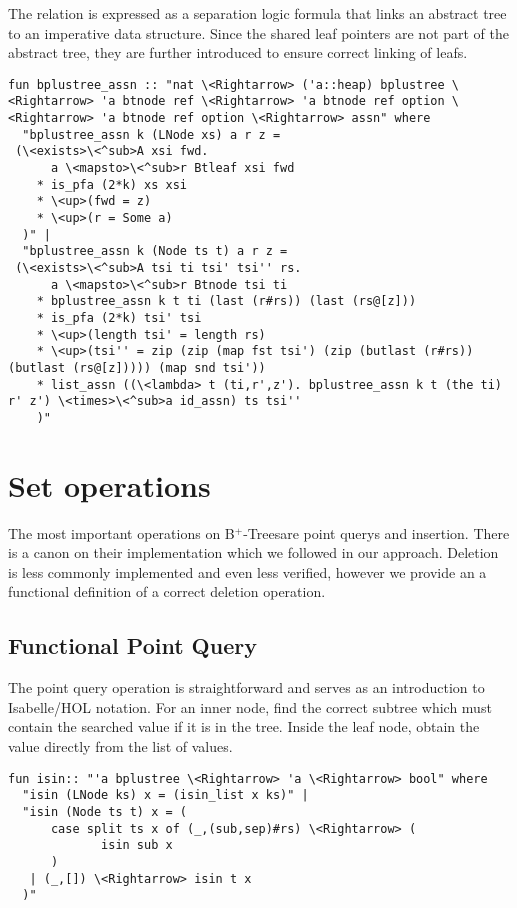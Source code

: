 \documentclass[a4paper,UKenglish,cleveref, autoref, thm-restate]{lipics-v2021}
\newcommand{\btrees}{B$^+$-Trees}
\begin{document}
The relation is expressed as a separation logic formula that links an abstract tree to an
imperative data structure.
Since the shared leaf pointers are not part of the abstract tree,
they are further introduced to ensure correct linking of leafs.

\begin{lstlisting}[mathescape=true, language=Isabelle,label=lst:btree-relation]
fun bplustree_assn :: "nat \<Rightarrow> ('a::heap) bplustree \<Rightarrow> 'a btnode ref \<Rightarrow> 'a btnode ref option \<Rightarrow> 'a btnode ref option \<Rightarrow> assn" where
  "bplustree_assn k (LNode xs) a r z =
 (\<exists>\<^sub>A xsi fwd.
      a \<mapsto>\<^sub>r Btleaf xsi fwd
    * is_pfa (2*k) xs xsi
    * \<up>(fwd = z)
    * \<up>(r = Some a)
  )" |
  "bplustree_assn k (Node ts t) a r z =
 (\<exists>\<^sub>A tsi ti tsi' tsi'' rs.
      a \<mapsto>\<^sub>r Btnode tsi ti
    * bplustree_assn k t ti (last (r#rs)) (last (rs@[z]))
    * is_pfa (2*k) tsi' tsi
    * \<up>(length tsi' = length rs)
    * \<up>(tsi'' = zip (zip (map fst tsi') (zip (butlast (r#rs)) (butlast (rs@[z])))) (map snd tsi'))
    * list_assn ((\<lambda> t (ti,r',z'). bplustree_assn k t (the ti) r' z') \<times>\<^sub>a id_assn) ts tsi''
    )"
\end{lstlisting}

\section{Set operations}
\label{sec:set}

The most important operations on \btrees are point querys and insertion.
There is a canon on their implementation which we followed in our approach.
Deletion is less commonly implemented and even less verified,
however we provide an a functional definition of a correct deletion operation.

\subsection{Functional Point Query}
\label{sec:functional_pq}

The point query operation is straightforward and serves as an introduction
to Isabelle/HOL notation.
For an inner node, find the correct subtree which must contain
the searched value if it is in the tree.
Inside the leaf node, obtain the value directly from the list of values.

\begin{lstlisting}[mathescape=true, language=Isabelle,label=lst:isin-def]
fun isin:: "'a bplustree \<Rightarrow> 'a \<Rightarrow> bool" where
  "isin (LNode ks) x = (isin_list x ks)" |
  "isin (Node ts t) x = (
      case split ts x of (_,(sub,sep)#rs) \<Rightarrow> (
             isin sub x
      )
   | (_,[]) \<Rightarrow> isin t x
  )"
\end{lstlisting}
\end{document}
